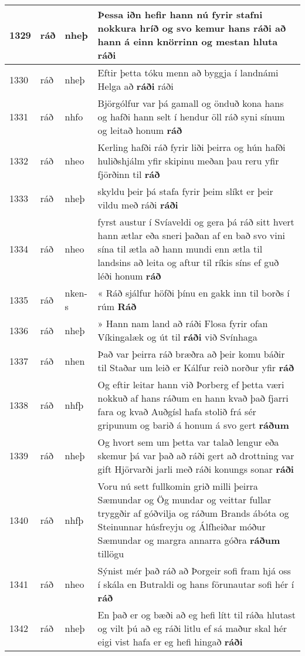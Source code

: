 \documentclass{article}
\begin{document}
\begin{longtable}{p{1cm}|p{1cm}|p{1cm}|p{13cm}}
\hline
1329&ráð&nheþ&Þessa iðn hefir hann nú fyrir stafni nokkura hríð og svo kemur hans ráði að hann á einn knörrinn og mestan hluta \textbf{ráði} \\
\hline
1330&ráð&nheþ&Eftir þetta tóku menn að byggja í landnámi Helga að \textbf{ráði} ráði\\
\hline
1331&ráð&nhfo&Björgólfur var þá gamall og önduð kona hans og hafði hann selt í hendur öll ráð syni sínum og leitað honum \textbf{ráð} \\
\hline
1332&ráð&nheo&Kerling hafði ráð fyrir liði þeirra og hún hafði huliðshjálm yfir skipinu meðan þau reru yfir fjörðinn til \textbf{ráð} \\
\hline
1333&ráð&nheþ&skyldu þeir þá stafa fyrir þeim slíkt er þeir vildu með ráði \textbf{ráði} \\
\hline
1334&ráð&nheo&fyrst austur í Svíaveldi og gera þá ráð sitt hvert hann ætlar eða sneri þaðan af en bað svo vini sína til ætla að hann mundi enn ætla til landsins að leita og aftur til ríkis síns ef guð léði honum \textbf{ráð} \\
\hline
1335&ráð&nken-s&« Ráð sjálfur höfði þínu en gakk inn til borðs í rúm \textbf{Ráð} \\
\hline
1336&ráð&nheþ&» Hann nam land að ráði Flosa fyrir ofan Víkingalæk og út til \textbf{ráði} við Svínhaga\\
\hline
1337&ráð&nhen&Það var þeirra ráð bræðra að þeir komu báðir til Staðar um leið er Kálfur reið norður yfir \textbf{ráð} \\
\hline
1338&ráð&nhfþ&Og eftir leitar hann við Þorberg ef þetta væri nokkuð af hans ráðum en hann kvað það fjarri fara og kvað Auðgísl hafa stolið frá sér gripunum og barið á honum á svo gert \textbf{ráðum} \\
\hline
1339&ráð&nheþ&Og hvort sem um þetta var talað lengur eða skemur þá var það að ráði gert að drottning var gift Hjörvarði jarli með ráði konungs sonar \textbf{ráði} \\
\hline
1340&ráð&nhfþ&Voru nú sett fullkomin grið milli þeirra Sæmundar og Ög mundar og veittar fullar tryggðir af góðvilja og ráðum Brands ábóta og Steinunnar húsfreyju og Álfheiðar móður Sæmundar og margra annarra góðra \textbf{ráðum} tillögu\\
\hline
1341&ráð&nheo&Sýnist mér það ráð að Þorgeir sofi fram hjá oss í skála en Butraldi og hans förunautar sofi hér í \textbf{ráð} \\
\hline
1342&ráð&nheþ&En það er og bæði að eg hefi lítt til ráða hlutast og vilt þú að eg ráði litlu ef sá maður skal hér eigi vist hafa er eg hefi hingað \textbf{ráði} \\

\end{longtable}
\end{document}
